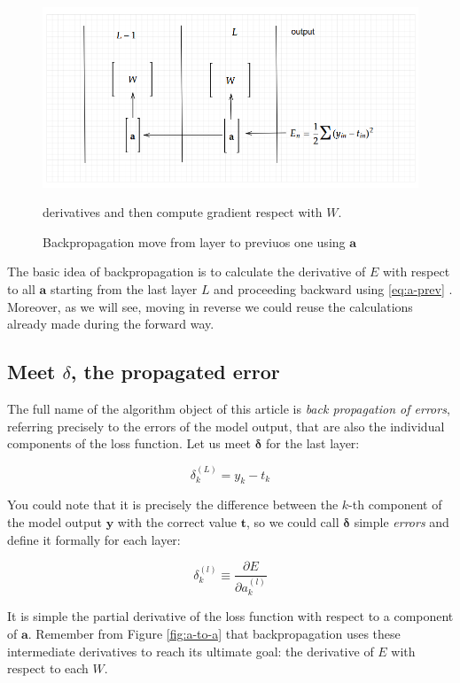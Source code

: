 \documentclass{article}
\begin{document}
\begin{figure}[H]
    \centering
    \includegraphics[width=0.6\linewidth]{images/backprop.png}
    \caption{Backpropagation move from layer to previuos one using $\boldsymbol{a}$} derivatives and then compute gradient respect with $W$.   
    \label{fig:a-to-a}
\end{figure}


The basic idea of backpropagation is to calculate the derivative of $E$ with respect to all $\boldsymbol{a}$ starting from the last layer $L$ and proceeding backward using \eqref{eq:a-prev} . Moreover, as we will see,  moving in reverse we could reuse the calculations already made during the forward way.   

\subsection{Meet $\delta$, the propagated error}\label{sec:meet-delta}

The full name of the algorithm object of this article is \textit{back propagation of errors}, referring precisely to the errors of the model output, that are also the individual components of the loss function.  Let us meet $\boldsymbol{\delta}$ for the last layer:

\begin{equation}
\delta _{k}^{( L)} =y_{k} -t_{k} \label{eq:last-error}
\end{equation}

You could note that it is precisely the difference between the $k$-th component of the model output $\boldsymbol{y}$ with the correct value $\boldsymbol{t}$, so we could call  $\boldsymbol{\delta}$ simple \textit{errors} and define it formally for each layer:


\begin{equation}
\delta _{k}^{( l)} \equiv \frac{\partial E}{\partial a_{k}^{( l)}} \label{eq:error} 
\end{equation}

It is simple the partial derivative of the loss function with respect to a component of $\boldsymbol{a}$. Remember from Figure \eqref{fig:a-to-a}  that backpropagation uses these intermediate derivatives to reach its ultimate goal: the derivative of $E$ with respect to each $W$.
\end{document}

